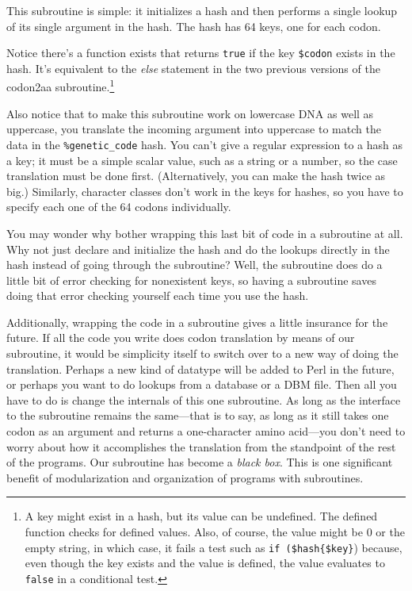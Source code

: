 This subroutine is simple: it initializes a hash and then performs a single lookup of its single argument in the hash. The hash has 64 keys, one for each codon.

Notice there's a function exists that returns \verb|true| if the key \verb|$codon| exists in the hash. It's equivalent to the \textit{else} statement in the two previous versions of the codon2aa subroutine.\footnote{A key might exist in a hash, but its value can be undefined.  The defined function checks for defined values. Also, of course, the value might be 0 or the empty string, in which case, it fails a test such as \verb|if ($hash{$key}|) because, even though the key exists and the value is defined, the value evaluates to \verb|false| in a conditional test.}

Also notice that to make this subroutine work on lowercase DNA as well as uppercase, you translate the incoming argument into uppercase to match the data in the \verb|%genetic_code| hash. You can't give a regular expression to a hash as a key; it must be a simple scalar value, such as a string or a number, so the case translation must be done first.  (Alternatively, you can make the hash twice as big.) Similarly, character classes don't work in the keys for hashes, so you have to specify each one of the 64 codons individually.

You may wonder why bother wrapping this last bit of code in a subroutine at all. Why not just declare and initialize the hash and do the lookups directly in the hash instead of going through the subroutine? Well, the subroutine does do a little bit of error checking for nonexistent keys, so having a subroutine saves doing that error checking yourself each time you use the hash.

Additionally, wrapping the code in a subroutine gives a little insurance for the future. If all the code you write does codon translation by means of our subroutine, it would be simplicity itself to switch over to a new way of doing the translation. Perhaps a new kind of datatype will be added to Perl in the future, or perhaps you want to do lookups from a database or a DBM file. Then all you have to do is change the internals of this one subroutine. As long as the interface to the subroutine remains the same—that is to say, as long as it still takes one codon as an argument and returns a one-character amino acid—you don't need to worry about how it accomplishes the translation from the standpoint of the rest of the programs. Our subroutine has become a \textit{black box}. This is one significant benefit of modularization and organization of programs with subroutines. 

